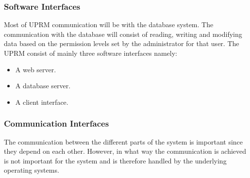 \subsubsection{Software Interfaces}
	Most of UPRM communication will be with the database system. The communication with the database will consist of reading, writing and modifying data based on the permission levels set by the administrator for that user. The UPRM consist of mainly three software interfaces namely:
	\begin{itemize}
		\item A web server.
		\item A database server.
		\item A client interface.
	\end{itemize}

\subsubsection{Communication Interfaces}
	The communication between the different parts of the system is important since they depend on each
	other. However, in what way the communication is achieved is not important for the system and is
	therefore handled by the underlying operating systems.
